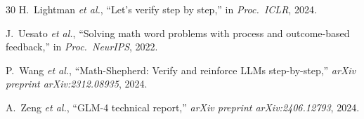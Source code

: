 \begin{thebibliography}{30}
H.~Lightman \textit{et al.}, ``Let's verify step by step,'' in \textit{Proc.\ ICLR}, 2024.

J.~Uesato \textit{et al.}, ``Solving math word problems with process and outcome-based feedback,'' in \textit{Proc.\ NeurIPS}, 2022.

P.~Wang \textit{et al.}, ``Math-Shepherd: Verify and reinforce LLMs step-by-step,'' \textit{arXiv preprint arXiv:2312.08935}, 2024.

A.~Zeng \textit{et al.}, ``GLM-4 technical report,'' \textit{arXiv preprint arXiv:2406.12793}, 2024.

\end{thebibliography}
